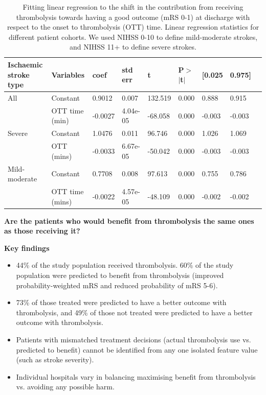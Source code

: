 \newpage
\begin{table}[H]
    \caption{Fitting linear regression to the shift in the contribution from receiving thrombolysis towards having a good outcome (mRS 0-1) at discharge with respect to the onset to thrombolysis (OTT) time. Linear regression statistics for different patient cohorts. We used NIHSS 0-10 to define mild-moderate strokes, and NIHSS 11+ to define severe strokes.}
    \centering
        \begin{tabular}{lllllllll}
        \toprule
         Ischaemic stroke type & Variables & coef & std err & t & P$>$$|$t$|$ & [0.025 & 0.975] \\ 
         \midrule
        All & Constant & 0.9012 & 0.007 & 132.519 & 0.000 & 0.888 & 0.915\\
        & OTT time (min) &  -0.0027  & 4.04e-05 & -68.058 & 0.000 & -0.003 & -0.003\\   
        \midrule
        Severe & Constant & 1.0476  &    0.011  & 96.746 & 0.000 & 1.026 & 1.069\\
        & OTT (mins) & -0.0033 &  6.67e-05  & -50.042 & 0.000 & -0.003 & -0.003\\ 
        \midrule
        Mild-moderate & Constant &           0.7708 &     0.008   & 97.613 & 0.000 & 0.755 & 0.786\\
        & OTT time (mins) &  -0.0022 &   4.57e-05 & -48.109 & 0.000 & -0.002 & -0.002\\
        \bottomrule
        \end{tabular}
      \label{fig:stats_table_mrs1}
\end{table}



\textbf{Are the patients who would benefit from thrombolysis the same ones as those receiving it? \cite{pearn_are_2024}}

\textbf{Key findings}

\begin{itemize}
    \item 44\% of the study population received thrombolysis. 60\% of the study population were predicted to benefit from thrombolysis (improved probability-weighted mRS and reduced probability of mRS 5-6).
    
    \item 73\% of those treated were predicted to have a better outcome with thrombolysis, and 49\% of those not treated were predicted to have a better outcome with thrombolysis.
    
    \item Patients with mismatched treatment decisions (actual thrombolysis use vs. predicted to benefit) cannot be identified from any one isolated feature value (such as stroke severity).
    
    \item Individual hospitals vary in balancing maximising benefit from thrombolysis vs. avoiding any possible harm.
\end{itemize}

